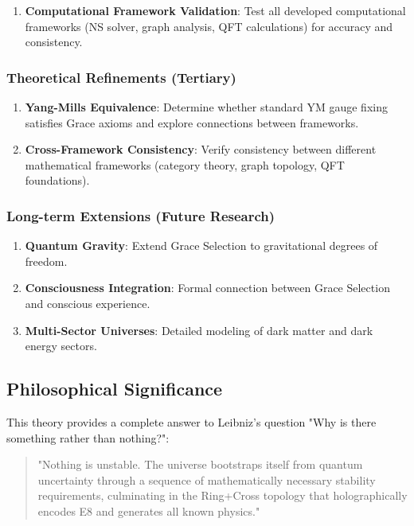 \documentclass[12pt,a4paper]{article}
\begin{document}
\begin{itemize}
\begin{itemize}
\begin{enumerate}
\item \textbf{Computational Framework Validation}: Test all developed computational frameworks (NS solver, graph analysis, QFT calculations) for accuracy and consistency.
\end{enumerate}

\subsubsection{Theoretical Refinements (Tertiary)}
\begin{enumerate}
\item \textbf{Yang-Mills Equivalence}: Determine whether standard YM gauge fixing satisfies Grace axioms and explore connections between frameworks.

\item \textbf{Cross-Framework Consistency}: Verify consistency between different mathematical frameworks (category theory, graph topology, QFT foundations).
\end{enumerate}

\subsubsection{Long-term Extensions (Future Research)}
\begin{enumerate}
\item \textbf{Quantum Gravity}: Extend Grace Selection to gravitational degrees of freedom.

\item \textbf{Consciousness Integration}: Formal connection between Grace Selection and conscious experience.

\item \textbf{Multi-Sector Universes}: Detailed modeling of dark matter and dark energy sectors.
\end{enumerate}

\subsection{Philosophical Significance}

This theory provides a complete answer to Leibniz's question "Why is there something rather than nothing?":

\begin{quote}
"Nothing is unstable. The universe bootstraps itself from quantum uncertainty through a sequence of mathematically necessary stability requirements, culminating in the Ring+Cross topology that holographically encodes E8 and generates all known physics."
\end{quote}


\end{itemize}
\end{itemize}
\end{document}

